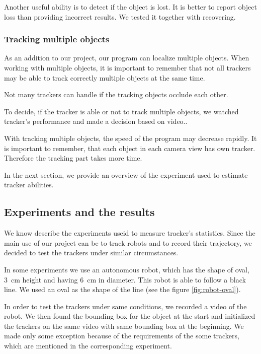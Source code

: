 Another useful ability is to detect if the object is lost. It is better to
report object loss than providing incorrect results. We tested it together with
recovering.

\subsubsection*{Tracking multiple objects}

As an addition to our project, our program can localize multiple objects. When
working with multiple objects, it is important to remember that not all
trackers may be able to track correctly multiple objects at the same time.

Not many trackers can handle if the tracking objects occlude each other.

To decide, if the tracker is able or not to track multiple objects, we watched
tracker's performance and made a decision based on video..

With tracking multiple objects, the speed of the program may decrease rapidly.
It is important to remember, that each object in each camera view has own
tracker. Therefore the tracking part takes more time.

In the next section, we provide an overview of the experiment used to estimate
tracker abilities.


\subsection{Experiments and the results}

We know describe the experiments useid to measure tracker's statistics. Since the
main use of our project can be to track robots and to record their trajectory,
we decided to test the trackers under similar circumstances.

In some experiments we use an autonomous robot, which has the shape of oval, 3~cm
height and having 6~cm in diameter. This robot is able to follow a black line.
We used an oval as the shape of the line (see the figure \ref{fig:robot-oval}).

In order to test the trackers under same conditions, we recorded a video of the
robot. We then found the bounding box for the object at the start and
initialized the trackers on the same video with same bounding box at the
beginning. We made only some exception because of the requirements of the some
trackers, which are mentioned in the corresponding experiment.

